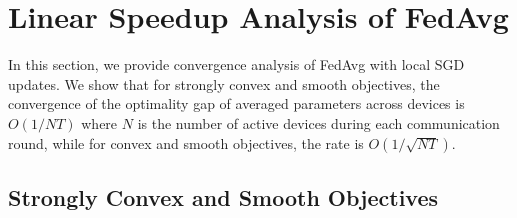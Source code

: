 


\section{Linear Speedup Analysis of FedAvg}

In this section, we provide convergence analysis of FedAvg with local
SGD updates. We show that for strongly convex and smooth objectives,
the convergence of the optimality gap of averaged parameters across
devices is $O(1/NT)$ where $N$ is the number of active devices during
each communication round, while for convex and smooth objectives,
the rate is $O(1/\sqrt{NT})$. 

\subsection{Strongly Convex and Smooth Objectives}

